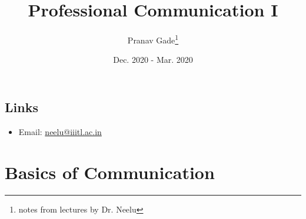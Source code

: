 \documentclass[10pt, a4paper]{report}
\author{Pranav Gade\thanks{notes from lectures by Dr. Neelu}}
\date{Dec. 2020 - Mar. 2020}
\title{Professional Communication I}
\begin{document}
	\maketitle
	\section*{Links}
	\begin{itemize}
		\item Email: \href{mailto:neelu@iiitl.ac.in}{neelu@iiitl.ac.in}
	\end{itemize}
	\newpage
	
	\chapter{Basics of Communication}
	
\end{document}
